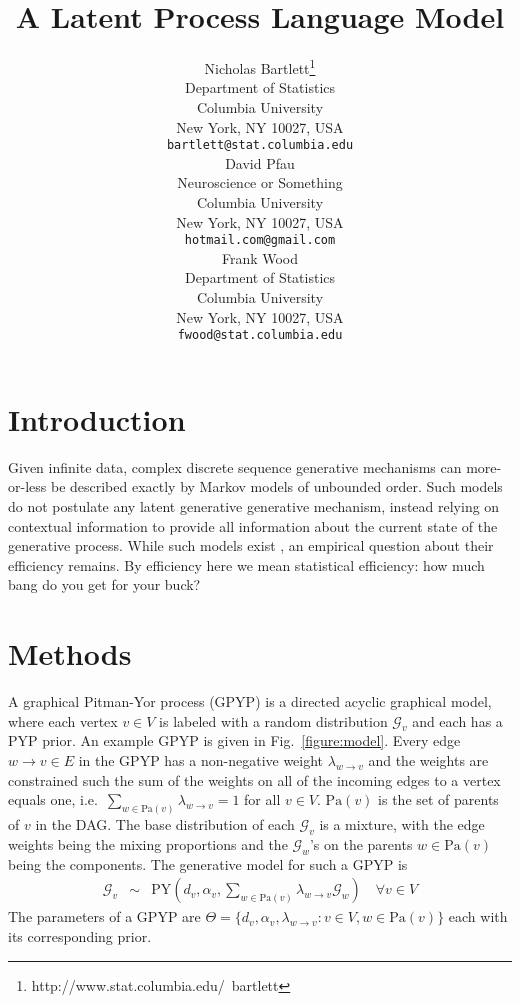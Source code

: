 \documentclass{article}
\title{A Latent Process Language Model}
\author{
Nicholas Bartlett\thanks{ http://www.stat.columbia.edu/~bartlett} \\
Department of Statistics\\
Columbia University\\
New York, NY 10027, USA \\
\texttt{bartlett@stat.columbia.edu} \\
\And
David Pfau \\
Neuroscience or Something \\
Columbia University\\
New York, NY 10027, USA \\
\texttt{hotmail.com@gmail.com} \\
\AND
Frank Wood \\
Department of Statistics\\
Columbia University\\
New York, NY 10027, USA \\
\texttt{fwood@stat.columbia.edu} \\
}
\newcommand{\comment}[1]{}
\begin{document}
\makeanontitle

\begin{abstract}

\end{abstract}

\section{Introduction}

Given infinite data, complex discrete sequence generative mechanisms can more-or-less be described exactly by Markov models of unbounded order.  Such models do not postulate any latent generative generative mechanism, instead relying on contextual information to provide all information about the current state of the generative process.  While such models exist \cite{Mochihashi2008, Wood2009}, an empirical question about their efficiency remains.   By efficiency here we mean statistical efficiency: how much bang do you get for your buck?

\section{Methods}



A graphical Pitman-Yor process (GPYP) is a directed acyclic graphical model, where each vertex $v\in V$ is labeled with a random distribution $\mathcal{G}_{v}$ and each has a PYP prior.  An example GPYP is given in Fig.~\ref{figure:model}.  Every edge $w\rightarrow v\in E$ in the GPYP  has a non-negative weight $\lambda_{w \rightarrow v}$ and the weights are constrained such the sum of the weights on all of the incoming edges to a vertex equals one, i.e.~$\sum_{w \in \mathrm{Pa}(v)}\lambda_{{w \rightarrow v}} = 1$ for all $v \in V.$  $\mathrm{Pa}(v)$ is the set of parents of $v$ in the DAG.  The base distribution of each $\mathcal{G}_{v}$ is a mixture,  with the edge weights being the mixing proportions and the $\mathcal{G}_w$'s on the parents $w\in\mathrm{Pa}(v)$ being the components.  The generative model for such a GPYP is 
%
\begin{eqnarray*}
\mathcal{G}_v \comment{| \{ {G}_w : w \in \mathrm{Pa}(v) \}} &\sim& \text{PY}\left(d_v,\alpha_v,\sum_{w \in \mathrm{Pa}(v)}\lambda_{{w \rightarrow v}} \mathcal{G}_w\right) \quad \forall v\in V
\end{eqnarray*}
%
The parameters of a GPYP are $\Theta = \{ d_v, \alpha_v, \lambda_{w\rightarrow v}   : v \in V,w\in\mathrm{Pa}(v)\}$ each with its corresponding prior.
\end{document}
